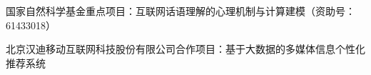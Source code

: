 \begin{resume}


  \begin{achievements}

  \item 国家自然科学基金重点项目：互联网话语理解的心理机制与计算建模（资助号：61433018）

  \item 北京汉迪移动互联网科技股份有限公司合作项目：基于大数据的多媒体信息个性化推荐系统

  \end{achievements}


\end{resume}
